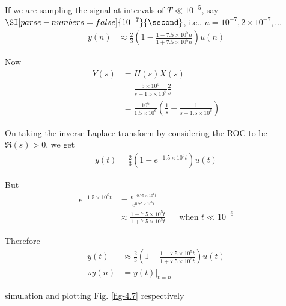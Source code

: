 \documentclass[journal,12pt,twocolumn]{IEEEtran}
\providecommand{\brak}[1]{\ensuremath{\left(#1\right)}}
\numberwithin{equation}{section}
\numberwithin{figure}{section}
\renewcommand\thesection{\arabic{section}}
\begin{document}
\begin{enumerate}[label=\thesection.\arabic*.,ref=\thesection.\theenumi]
	If we are sampling the signal at intervals of $T \ll 10^{-5}$, say $\SI[parse-numbers=false]{10^{-7}}{\second}$, i.e., $n = 10^{-7}, 2\times10^{-7},\ldots$
	\begin{align}
		y(n) &\approx \frac{2}{3} \brak{1 - \frac{1-7.5\times10^5n}{1+7.5\times10^5n}}u(n)
	\end{align}
	
	Now
	\begin{align}
		Y(s) &= H(s)X(s) \\
		&= \frac{5\times10^5}{s+1.5\times10^6} \frac{2}{s} \\
		&= \frac{10^6}{1.5\times10^6} \brak{\frac{1}{s} - \frac{1}{s+1.5\times10^6}}
	\end{align}
	
	On taking the inverse Laplace transform by considering the ROC to be $\Re(s) > 0$, we get
	\begin{align}
		y(t) = \frac{2}{3}\brak{1 - e^{-1.5\times10^6t}}u(t)
	\end{align}
	
	But 
	\begin{align}
		e^{-1.5\times 10^6 t} &= \frac{e^{-0.75 \times 10^6 t}}{e^{0.75 \times 10^6 t}} \\
		&\approx \frac{1-7.5\times10^5t}{1+7.5\times10^5t} && \text{when } t \ll 10^{-6} 
	\end{align}
	
	Therefore
	\begin{align}
		y(t) &\approx \frac{2}{3} \brak{1 - \frac{1-7.5\times10^5t}{1+7.5\times10^5t}} u(t) \\
		\therefore y(n) &= y(t)|_{t=n}
	\end{align}
	
     simulation and plotting Fig. \ref{fig-4.7} respectively
	
	

\end{enumerate}
\end{document}
